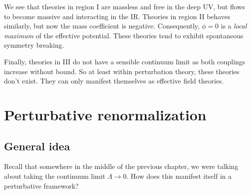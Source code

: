 \documentclass[a4paper]{article}
\begin{document}
\begin{center}
\end{center}
We see that theories in region I are massless and free in the deep UV, but flows to become massive and interacting in the IR. Theories in region II behaves similarly, but now the mass coefficient is negative. Consequently, $\phi = 0$ is a \emph{local maximum} of the effective potential. These theories tend to exhibit spontaneous symmetry breaking.

Finally, theories in III do not have a sensible continuum limit as both couplings increase without bound. So at least within perturbation theory, these theories don't exist. They can only manifest themselves as effective field theories.

\section{Perturbative renormalization}
\subsection{General idea}
Recall that somewhere in the middle of the previous chapter, we were talking about taking the continuum limit $\Lambda \to 0$. How does this manifest itself in a perturbative framework?
\end{document}
